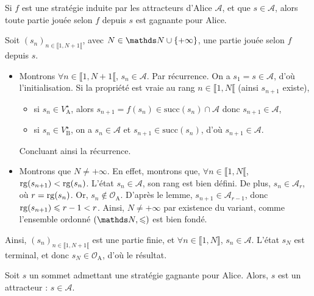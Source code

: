 \begin{prop}
	Si $f$\/ est une stratégie induite par les attracteurs d'Alice $\mathcal{A}$, et que $s \in \mathcal{A}$, alors toute partie jouée selon $f$\/ depuis $s$\/ est gagnante pour Alice.
\end{prop}

\begin{prv}
	Soit $(s_n)_{n\in\llbracket 1,N + 1\llbracket}$, avec $N \in \N\cup \{+\infty\}$, une partie jouée selon $f$ depuis $s$.
	\begin{itemize}
		\item Montrons $\forall n \in \llbracket 1,N+1 \llbracket$, $s_n \in \mathcal{A}$.
			Par récurrence. On a $s_1 = s \in \mathcal{A}$, d'où l'initialisation. Si la propriété est vraie au rang $n \in \llbracket 1,N \llbracket$ (ainsi $s_{n+1}$ existe),
			\begin{itemize}
				\item si $s_n \in V_\mathrm{A}^\star$, alors $s_{n+1} = f(s_n) \in \mathrm{succ}(s_n) \cap \mathcal{A}$ donc $s_{n+1} \in \mathcal{A}$,
				\item si $s_n \in V_\mathrm{B}^\star$, on a $s_n \in \mathcal{A}$\/ et $s_{n+1} \in \mathrm{succ}(s_n)$, d'où $s_{n+1} \in \mathcal{A}$.
			\end{itemize}
			Concluant ainsi la récurrence.
		\item Montrons que $N \neq +\infty$.
			En effet, montrons que, $\forall n \in \llbracket 1,N \llbracket$, $\operatorname{rg}(s_{n+1}) < \operatorname{rg}(s_n)$.
			L'état $s_n \in \mathcal{A}$, son rang est bien défini. De plus, $s_n \in \mathcal{A}_{r}$, où $r = \operatorname{rg}(s_n)$. Or, $s_n \not\in \mathcal{O}_\mathrm{A}$.
			D'après le lemme, $s_{n+1} \in \mathcal{A}_{r - 1}$, donc $\operatorname{rg}(s_{n+1}) \leqslant r - 1 < r$.
			Ainsi, $N \neq +\infty$\/ par existence du variant, comme l'ensemble ordonné $(\N, \le)$\/ est bien fondé.
	\end{itemize}
	Ainsi, $(s_n)_{n\in\llbracket 1,N + 1\llbracket}$\/ est une partie finie, et $\forall n \in \llbracket 1,N \rrbracket$, $s_n \in \mathcal{A}$. L'état $s_N$\/ est terminal, et donc $s_N \in \mathcal{O}_\mathrm{A}$, d'où le résultat.
\end{prv}

\begin{prop}
	Soit $s$\/ un sommet admettant une stratégie gagnante pour Alice. Alors, $s$\/ est un attracteur : $s \in \mathcal{A}$.
\end{prop}

